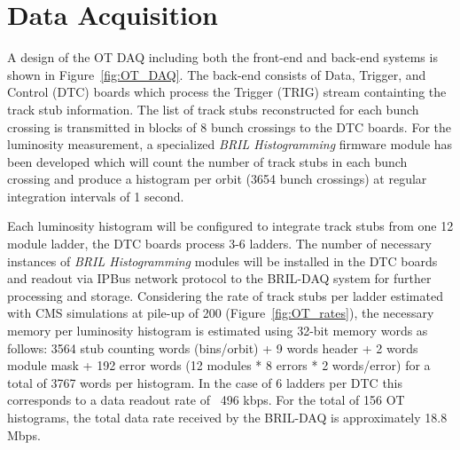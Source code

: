 \section{Data Acquisition}

A design of the OT DAQ including both the front-end and back-end systems is shown in Figure~\ref{fig:OT_DAQ}.
The back-end consists of Data, Trigger, and Control (DTC) boards which process the Trigger (TRIG) stream containting the track stub information. 
The list of track stubs reconstructed for each bunch crossing is transmitted in blocks of 8 bunch crossings to the DTC boards.
For the luminosity measurement, a specialized {\it BRIL Histogramming} firmware module has been developed which will count the number of track stubs in each bunch crossing and produce a histogram per orbit (3654 bunch crossings) at regular integration intervals of 1 second.

Each luminosity histogram will be configured to integrate track stubs from one 12 module ladder, the DTC boards process 3-6 ladders.
The number of necessary instances of  {\it BRIL Histogramming} modules will be installed in the DTC boards and readout via IPBus network protocol to the BRIL-DAQ system for further processing and storage.
Considering the rate of track stubs per ladder estimated with CMS simulations at pile-up of 200  (Figure~\ref{fig:OT_rates}),  the necessary memory per luminosity histogram is estimated using 32-bit memory words as follows: 3564 stub counting words (bins/orbit) + 9 words header + 2 words module mask + 192 error words (12 modules * 8 errors * 2 words/error) for a total of 3767 words per histogram.
In the case of 6 ladders per DTC this corresponds to a data readout rate of ~496 kbps.
For the total of 156 OT histograms, the total data rate received by the BRIL-DAQ is approximately 18.8 Mbps.


\clearpage

